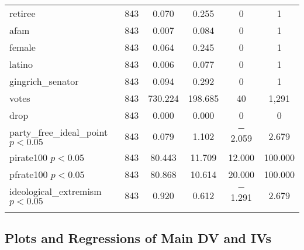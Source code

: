 \documentclass[12pt]{article}
\begin{document}
\begin{table}[!htbp]
\begin{tabular}{@{\extracolsep{5pt}}lccccc}
		retiree & 843 & 0.070 & 0.255 & 0 & 1 \\ 
		afam & 843 & 0.007 & 0.084 & 0 & 1 \\ 
		female & 843 & 0.064 & 0.245 & 0 & 1 \\ 
		latino & 843 & 0.006 & 0.077 & 0 & 1 \\ 
		gingrich\_senator & 843 & 0.094 & 0.292 & 0 & 1 \\ 
		votes & 843 & 730.224 & 198.685 & 40 & 1,291 \\ 
		drop & 843 & 0.000 & 0.000 & 0 & 0 \\ 
		\hline
		party\_free\_ideal\_point $ p < 0.05 $ & 843 & 0.079 & 1.102 & $-$2.059 & 2.679 \\ 
		pirate100 $ p < 0.05 $ & 843 & 80.443 & 11.709 & 12.000 & 100.000 \\ 
		pfrate100 $ p < 0.05 $ & 843 & 80.868 & 10.614 & 20.000 & 100.000 \\ 
		ideological\_extremism $ p < 0.05 $ & 843 & 0.920 & 0.612 & $-$1.291 & 2.679 \\ 
		\hline \\[-1.8ex] 
	\end{tabular} 
\end{table}

\pagebreak

\subsection{Plots and Regressions of Main DV and IVs}
\end{document}
